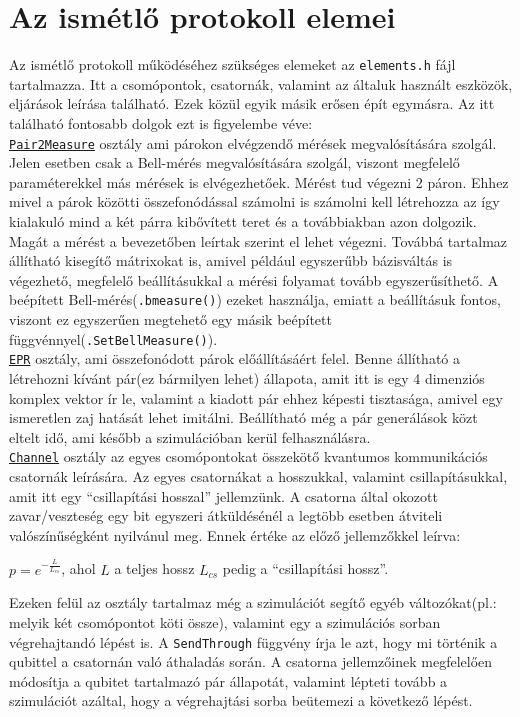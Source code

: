 \section{Az ismétlő protokoll elemei }

Az ismétlő protokoll működéséhez szükséges elemeket az \texttt{elements.h} fájl tartalmazza. Itt a csomópontok, csatornák, valamint az általuk használt eszközök, eljárások leírása található. Ezek közül egyik másik erősen épít egymásra. Az itt található fontosabb dolgok ezt is figyelembe véve:\\
\underline{\texttt{Pair2Measure}} osztály ami párokon elvégzendő mérések megvalósítására szolgál. Jelen esetben csak a Bell-mérés megvalósítására szolgál, viszont megfelelő paraméterekkel más mérések is elvégezhetőek. Mérést tud végezni 2 páron.  Ehhez mivel a párok közötti összefonódással számolni is számolni kell létrehozza az így kialakuló mind a két párra kibővített teret és a továbbiakban azon dolgozik. Magát a mérést a bevezetőben leírtak szerint el lehet végezni. Továbbá tartalmaz állítható kisegítő mátrixokat is, amivel például egyszerűbb bázisváltás is végezhető, megfelelő beállításukkal a mérési folyamat tovább egyszerűsíthető. A beépített Bell-mérés(\texttt{.bmeasure()}) ezeket használja, emiatt a beállításuk fontos, viszont ez egyszerűen megtehető egy másik beépített függvénnyel(\texttt{.SetBellMeasure()}).\\
\underline{\texttt{EPR}} osztály, ami összefonódott párok előállításáért felel. Benne állítható a létrehozni kívánt pár(ez bármilyen lehet) állapota, amit itt is egy 4 dimenziós komplex vektor ír le, valamint a kiadott pár ehhez képesti tisztasága, amivel egy ismeretlen zaj hatását lehet imitálni. Beállítható még a pár generálások közt eltelt idő, ami később a szimulációban kerül felhasználásra.\\
\underline{\texttt{Channel}} osztály az egyes csomópontokat összekötő kvantumos kommunikációs csatornák leírására. Az egyes csatornákat a hosszukkal, valamint csillapításukkal, amit itt egy ``csillapítási hosszal'' jellemzünk. A csatorna által okozott zavar/veszteség egy bit egyszeri átküldésénél a legtöbb esetben átviteli valószínűségként nyilvánul meg. Ennek értéke az előző jellemzőkkel leírva:\\
\begin{center}
$ p=e^{-\frac{L}{L_{cs}}}$, ahol $L$ a teljes hossz $L_{cs}$  pedig a ``csillapítási hossz''.\\
\end{center}
Ezeken felül az osztály tartalmaz még a szimulációt segítő egyéb változókat(pl.: melyik két csomópontot köti össze), valamint egy a szimulációs sorban végrehajtandó lépést is. A \texttt{SendThrough} függvény írja le azt, hogy mi történik a qubittel a csatornán való áthaladás során. A csatorna jellemzőinek megfelelően módosítja a qubitet tartalmazó pár állapotát, valamint lépteti tovább a szimulációt azáltal, hogy a végrehajtási sorba beütemezi a következő lépést.\\
